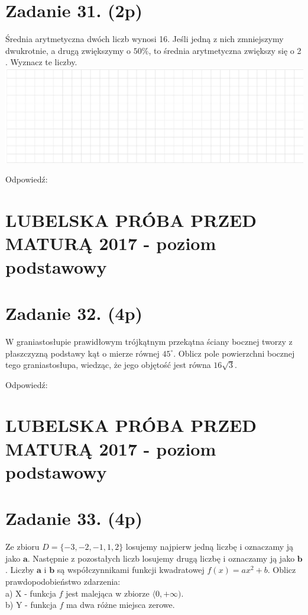 \documentclass[10pt]{article}
\begin{document}
\section*{Zadanie 31. (2p)}
Średnia arytmetyczna dwóch liczb wynosi 16. Jeśli jedną z nich zmniejszymy dwukrotnie, a drugą zwiększymy o \(50 \%\), to średnia arytmetyczna zwiększy się o 2 . Wyznacz te liczby.\\
\includegraphics[max width=\textwidth, center]{2024_11_21_d45b0573b36a3462565cg-10}

Odpowiedź:

\section*{LUBELSKA PRÓBA PRZED MATURĄ 2017 - poziom podstawowy}
\section*{Zadanie 32. (4p)}
W graniastosłupie prawidłowym trójkątnym przekątna ściany bocznej tworzy z płaszczyzną podstawy kąt o mierze równej \(45^{\circ}\). Oblicz pole powierzchni bocznej tego graniastosłupa, wiedząc, że jego objętość jest równa \(16 \sqrt{3}\).

Odpowiedź:

\section*{LUBELSKA PRÓBA PRZED MATURĄ 2017 - poziom podstawowy}
\section*{Zadanie 33. (4p)}
Ze zbioru \(D=\{-3,-2,-1,1,2\}\) losujemy najpierw jedną liczbę i oznaczamy ją jako \(\boldsymbol{a}\). Następnie z pozostałych liczb losujemy drugą liczbę i oznaczamy ją jako \(\boldsymbol{b}\). Liczby \(\boldsymbol{a}\) i \(\boldsymbol{b}\) są współczynnikami funkcji kwadratowej \(f(x)=a x^{2}+b\). Oblicz prawdopodobieństwo zdarzenia:\\
a) X - funkcja \(f\) jest malejąca w zbiorze \(\langle 0,+\infty)\).\\
b) Y - funkcja \(f\) ma dwa różne miejsca zerowe.
\end{document}
